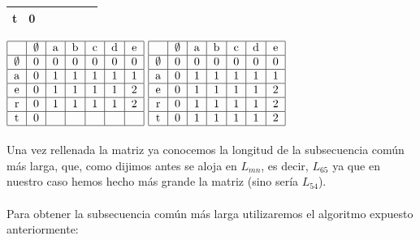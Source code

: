 \documentclass{article}
\begin{document}
\begin{center}
\begin{tabular}{ | c | c | c | c | c | c | c | }
					t & 0  &   &    &    &   &    \\
					\hline
				\end{tabular}
			    \)
	    		\hspace{.1in}
	    		\(
				\begin{tabular}{ | c | c | c | c | c | c | c | }
	    				\hline
					   & $\emptyset$ & a & b  & c  & d & e \\ \hline
					$\emptyset$ & 0 & 0 & 0  & 0  & 0 & 0  \\ \hline
					a & 0 & 1 & 1 & 1 & 1 & 1 \\ \hline
					e & 0 & 1 & 1 & 1 & 1 & 2 \\ \hline
					r & 0 & 1 & 1 & 1 & 1 & 2 \\ \hline
					t & 0  &   &    &    &   &    \\
					\hline
				\end{tabular}
			    \)
	    		\hspace{.1in}
	    		\(
				\begin{tabular}{ | c | c | c | c | c | c | c | }
	    				\hline
					   & $\emptyset$ & a & b  & c  & d & e \\ \hline
					$\emptyset$ & 0 & 0 & 0  & 0  & 0 & 0  \\ \hline
					a & 0 & 1 & 1 & 1 & 1 & 1 \\ \hline
					e & 0 & 1 & 1 & 1 & 1 & 2 \\ \hline
					r & 0 & 1 & 1 & 1 & 1 & 2 \\ \hline
					t & 0  & 1 & 1 & 1 & 1 & 2 \\
					\hline
				\end{tabular}
		    	\)
			\end{center}

			\paragraph{}
			Una vez  rellenada la matriz ya conocemos la longitud de la subsecuencia común más larga, que, como dijimos antes se aloja en $L_{mn}$, es decir, $L_{65}$ ya que en nuestro caso hemos hecho más grande la matriz (sino sería $L_{54}$).

			\paragraph{}
			Para obtener la subsecuencia común más larga utilizaremos el algoritmo expuesto anteriormente:
\end{document}
